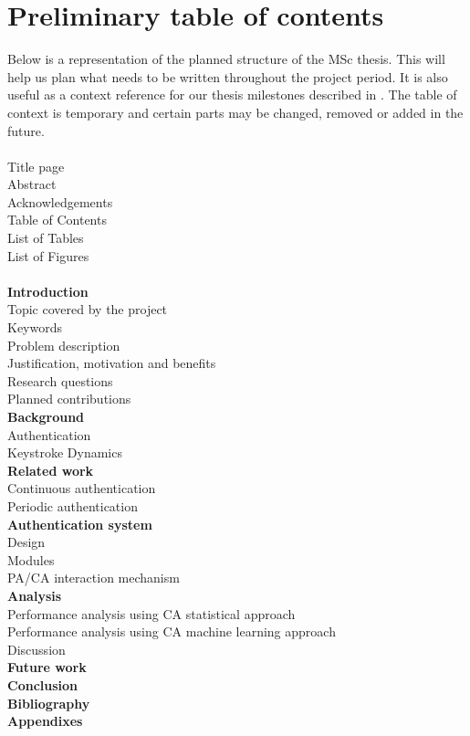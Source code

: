 \documentclass[informationsecurity]{gucmasterproject}
\begin{document}
\section{Preliminary table of contents}
\label{sec:milestones-toc}
Below is a representation of the planned structure of the MSc thesis.
This will help us plan what needs to be written throughout the project period.
It is also useful as a context reference for our thesis milestones described in .
The table of context is temporary and certain parts may be changed, removed or added in the future.
\\\\
\noindent Title page\\
Abstract\\
Acknowledgements\\
Table of Contents\\
List of Tables\\
List of Figures\\
\\
\textbf{Introduction}\\
\indent Topic covered by the project\\
\indent Keywords\\
\indent Problem description\\
\indent Justification, motivation and benefits\\
\indent Research questions\\
\indent Planned contributions\\
\textbf{Background}\\
\indent Authentication\\
\indent Keystroke Dynamics\\
\textbf{Related work}\\
\indent Continuous authentication\\
\indent Periodic authentication\\
\textbf{Authentication system}\\
\indent Design\\
\indent Modules\\
\indent PA/CA interaction mechanism\\
\textbf{Analysis}\\
\indent Performance analysis using CA statistical approach\\
\indent Performance analysis using CA machine learning approach\\
\indent Discussion\\
\textbf{Future work}\\
\textbf{Conclusion}\\
\textbf{Bibliography}\\
\textbf{Appendixes}
\end{document}
